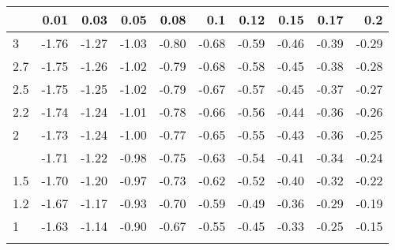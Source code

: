 
\begin{tabular}{lrrrrrrrrr}
\toprule{}
  & 0.01 & 0.03 & 0.05 & 0.08 & 0.1 & 0.12 & 0.15 & 0.17 & 0.2\\
\midrule{}
3 & -1.76 & -1.27 & -1.03 & -0.80 & -0.68 & -0.59 & -0.46 & -0.39 & -0.29\\
2.7 & -1.75 & -1.26 & -1.02 & -0.79 & -0.68 & -0.58 & -0.45 & -0.38 & -0.28\\
2.5 & -1.75 & -1.25 & -1.02 & -0.79 & -0.67 & -0.57 & -0.45 & -0.37 & -0.27\\
2.2 & -1.74 & -1.24 & -1.01 & -0.78 & -0.66 & -0.56 & -0.44 & -0.36 & -0.26\\
2 & -1.73 & -1.24 & -1.00 & -0.77 & -0.65 & -0.55 & -0.43 & -0.36 & -0.25\\
\addlinespace
1.7 & -1.71 & -1.22 & -0.98 & -0.75 & -0.63 & -0.54 & -0.41 & -0.34 & -0.24\\
1.5 & -1.70 & -1.20 & -0.97 & -0.73 & -0.62 & -0.52 & -0.40 & -0.32 & -0.22\\
1.2 & -1.67 & -1.17 & -0.93 & -0.70 & -0.59 & -0.49 & -0.36 & -0.29 & -0.19\\
1 & -1.63 & -1.14 & -0.90 & -0.67 & -0.55 & -0.45 & -0.33 & -0.25 & -0.15\\
\bottomrule{}
\end{tabular}

